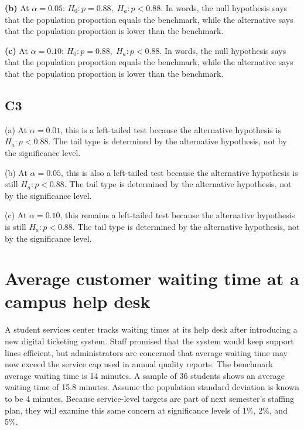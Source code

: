 \begin{ExamProblems}
		\textbf{(b)} At \(\alpha=0.05\): \(H_0\colon p=0.88,\; H_a\colon p<0.88\). In words, the null hypothesis says that the population proportion equals the benchmark, while the alternative says that the population proportion is lower than the benchmark.
		
		\textbf{(c)} At \(\alpha=0.10\): \(H_0\colon p=0.88,\; H_a\colon p<0.88\). In words, the null hypothesis says that the population proportion equals the benchmark, while the alternative says that the population proportion is lower than the benchmark.
		
		\subsection*{C3}
		(a) At \(\alpha=0.01\), this is a left-tailed test because the alternative hypothesis is \(H_a\colon p<0.88\). The tail type is determined by the alternative hypothesis, not by the significance level.\LeftTailGraph
		
		(b) At \(\alpha=0.05\), this is also a left-tailed test because the alternative hypothesis is still \(H_a\colon p<0.88\). The tail type is determined by the alternative hypothesis, not by the significance level.\LeftTailGraph
		
		(c) At \(\alpha=0.10\), this remains a left-tailed test because the alternative hypothesis is still \(H_a\colon p<0.88\). The tail type is determined by the alternative hypothesis, not by the significance level.\LeftTailGraph
		
		\item
		\section{Average customer waiting time at a campus help desk}
		A student services center tracks waiting times at its help desk after introducing a new digital ticketing system. Staff promised that the system would keep support lines efficient, but administrators are concerned that average waiting time may now exceed the service cap used in annual quality reports. The benchmark average waiting time is 14 minutes. A sample of 36 students shows an average waiting time of 15.8 minutes. Assume the population standard deviation is known to be 4 minutes. Because service-level targets are part of next semester's staffing plan, they will examine this same concern at significance levels of 1\%, 2\%, and 5\%.
		

\end{ExamProblems}
